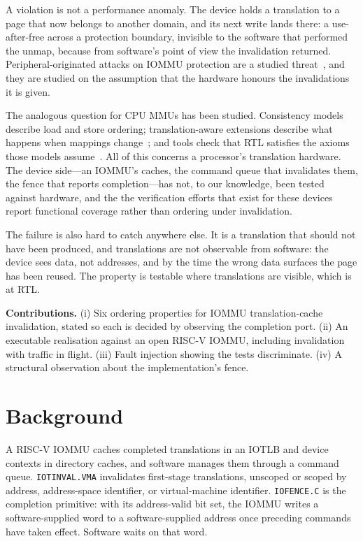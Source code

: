 \documentclass[conference]{IEEEtran}
\newcommand{\cmd}[1]{\mbox{\texttt{#1}}}
\begin{document}
A violation is not a performance anomaly. The device holds a translation to a
page that now belongs to another domain, and its next write lands there: a
use-after-free across a protection boundary, invisible to the software that
performed the unmap, because from software's point of view the invalidation
returned. Peripheral-originated attacks on IOMMU protection are a studied
threat~\cite{thunderclap}, and they are studied on the assumption that the
hardware honours the invalidations it is given.

The analogous question for CPU MMUs has been studied. Consistency models
describe load and store ordering; translation-aware extensions describe what
happens when mappings change~\cite{coatcheck,transform}; and tools check that
RTL satisfies the axioms those models assume~\cite{rtlcheck,realitycheck,qed}.
All of this concerns a processor's translation hardware. The device side---an
IOMMU's caches, the command queue that invalidates them, the fence that reports
completion---has not, to our knowledge, been tested against hardware, and the
the verification efforts that exist for these
devices~\cite{zdl10x,elbrus} report functional coverage rather than ordering
under invalidation.

The failure is also hard to catch anywhere else. It is a translation that should
not have been produced, and translations are not observable from software: the
device sees data, not addresses, and by the time the wrong data surfaces the
page has been reused. The property is testable where translations are visible,
which is at RTL.

\textbf{Contributions.} (i) Six ordering properties for IOMMU
translation-cache invalidation, stated so each is decided by observing the
completion port. (ii) An executable realisation against an open RISC-V IOMMU,
including invalidation with traffic in flight. (iii) Fault injection showing the
tests discriminate. (iv) A structural observation about the implementation's
fence.

\section{Background}
A RISC-V IOMMU caches completed translations in an IOTLB and device contexts in
directory caches, and software manages them through a command queue.
\cmd{IOTINVAL.VMA} invalidates first-stage translations, unscoped or scoped
by address, address-space identifier, or virtual-machine identifier.
\cmd{IOFENCE.C} is the completion primitive: with its address-valid bit set,
the IOMMU writes a software-supplied word to a software-supplied address once
preceding commands have taken effect. Software waits on that word.
\end{document}
